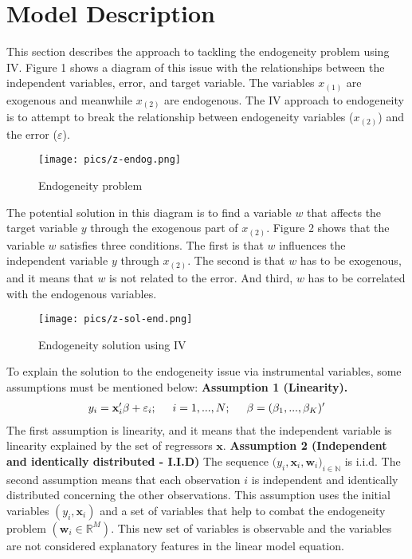 \documentclass{article}
\newcommand\tab[1][0.5cm]{\hspace*{#1}}
\begin{document}
\section{Model Description}
This section describes the approach to tackling the endogeneity problem using IV. Figure 1 shows a diagram of this issue with the relationships between the independent variables, error, and target variable. The variables $x_{(1)}$ are exogenous and meanwhile $x_{(2)}$ are endogenous. The IV approach to endogeneity is to attempt to break the relationship between endogeneity variables ($x_{(2)}$) and the error ($\varepsilon$).
\newline
\begin{figure}[h]
\centering
\texttt{[image: pics/z-endog.png]}
\caption{Endogeneity problem}
\label{fig:image2}
\end{figure}
\newline
The potential solution in this diagram is to find a variable $w$ that affects the target variable $y$ through the exogenous part of $x_{(2)}$. Figure 2 shows that the variable $w$ satisfies three conditions. The first is that $w$ influences the independent variable $y$ through $x_{(2)}$. The second is that $w$ has to be exogenous, and it means that $w$ is not related to the error. And third, $w$ has to be correlated with the endogenous variables.
\newline
\begin{figure}[h]
\centering
\texttt{[image: pics/z-sol-end.png]}
\caption{Endogeneity solution using IV}
\label{fig:image2}
\end{figure}
\newline
To explain the solution to the endogeneity issue via instrumental variables, some assumptions must be mentioned below:
\newline
\textbf{Assumption 1 (Linearity).}
\begin{align*}
y_{i} = \textbf{x}'_{i} \beta + \varepsilon_{i};\tab i = 1,..., N;\tab \beta = (\beta_{1},...,\beta_{K})'
\end{align*}
The first assumption is linearity, and it means that the independent variable is linearity explained by the set of regressors $\textbf{x}$.
\newline
\textbf{Assumption 2 (Independent and identically distributed - I.I.D)}
\newline
The sequence $({y_{i}, \textbf{x}_{i}, \textbf{w}_{i})_{i \in\mathbb{N}}}$ is i.i.d.
The second assumption means that each observation $i$ is independent and identically distributed concerning the other observations. This assumption uses the initial variables $({y_{i}, \textbf{x}_{i}})$ and a set of variables that help to combat the endogeneity problem $({ \textbf{w}_{i} \in \mathbb{R}^{M}})$. This new set of variables is observable and the variables are not considered explanatory features in the linear model equation.
\end{document}
